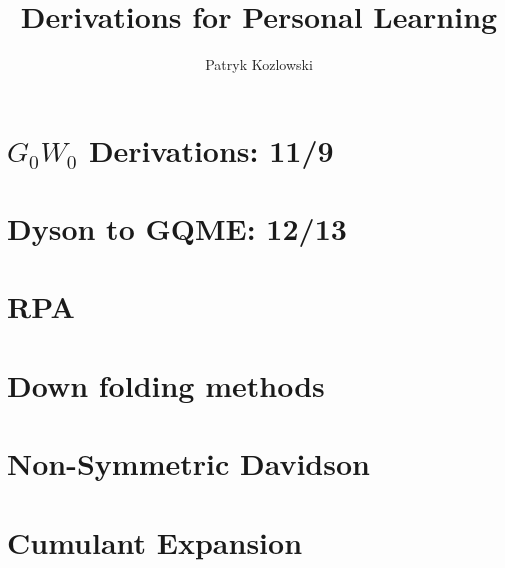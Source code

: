 \documentclass[12pt]{report}
\title{Derivations for Personal Learning}
\author{Patryk Kozlowski}
\begin{document}
\setcounter{tocdepth}{3}  %
\tableofcontents
\clearpage  %

\maketitle

\chapter{$G_0W_0$ Derivations: 11/9}

\chapter{Dyson to GQME: 12/13}

\chapter{RPA}

\chapter{Down folding methods}

\chapter{Non-Symmetric Davidson}

\chapter{Cumulant Expansion}

% 
% 
% 
% 
% 




% 


\end{document}

